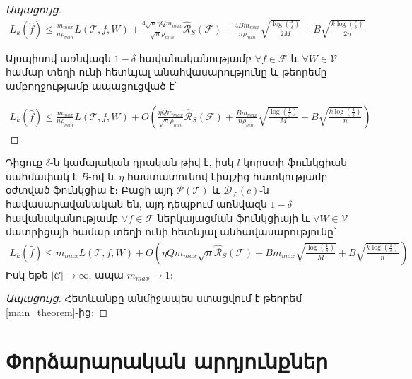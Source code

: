 \documentclass[12pt]{article}
\begin{document}
\begin{proof}[Ապացույց]
 
\begin{align*}
\label{ineq_rad_10}
L_k(\hat{f}) \leq  \frac{m_{max}}{n \rho_{min}}  L(\mathcal{T}, f, W) +
\frac{4 \sqrt{n}\eta Qm_{max}}{\sqrt{n}\rho_{min}} \hat{\mathcal{R}}_S(\mathcal{F})+    \frac{4Bm_{max}}{n\rho_{min}}\sqrt{\frac{\log \left( \frac{4}{\delta} \right)}{2M}} + B\sqrt{\frac{k\log \left(\frac{2}{\delta}\right) }{2n}}
\end{align*}

Այսպիսով առնվազն $1-\delta$ հավանականությամբ $\forall f \in \mathcal{F}$ և $\forall W \in \mathcal{V}$ համար տեղի ունի հետևյալ անահվասարությունը և թեորեմը ամբողջությամբ ապացուցված է՝

\begin{align*}
L_k(\hat{f}) \leq  \frac{m_{max}}{n \rho_{min}}  L(\mathcal{T}, f, W)+ O\left(
\frac{\eta Qm_{max}}{\sqrt{n}\rho_{min}} \hat{\mathcal{R}}_S(\mathcal{F})+    \frac{Bm_{max}}{n\rho_{min}}\sqrt{\frac{\log \left( \frac{1}{\delta} \right)}{M}} + B\sqrt{\frac{k\log \left(\frac{1}{\delta}\right) }{n}} \right)
\end{align*}
 \end{proof}
 
 
 \begin{corollary}
Դիցուք $\delta$-ն կամայական դրական թիվ է, իսկ $l$ կորստի ֆունկցիան սահմափակ է $B$-ով և $\eta$ հաստատունով Լիպշից հատկությամբ օժտված ֆունկցիա է։ Բացի այդ $\mathcal{P}(\mathcal{T})$ և $\mathcal{D}_\mathcal{T}(c)$-ն հավասարավանական են, այդ դեպքում առնվազն $1-\delta$ հավանականությամբ $\forall f \in \mathcal{F}$ ներկայացման ֆունկցիայի և $\forall W \in \mathcal{V}$ մատրիցայի համար տեղի ունի հետևյալ անհավասարությունը՝ 
\begin{align*}
L_k(\hat{f}) \leq m_{max}  L(\mathcal{T}, f, W)+ O\left(
\eta Qm_{max}\sqrt{n} \hat{\mathcal{R}}_S(\mathcal{F})+   Bm_{max}\sqrt{\frac{\log \left( \frac{1}{\delta} \right)}{M}} + B\sqrt{\frac{k\log \left(\frac{1}{\delta}\right) }{n}} \right)
\end{align*}
Իսկ եթե $|\mathcal{C}| \rightarrow \infty$, ապա $m_{max} \rightarrow 1$։
\end{corollary}
\begin{proof}[Ապացույց]
Հետևանքը անմիջապես ստացվում է թեորեմ \ref{main_theorem}-ից։
\end{proof} 


\pagebreak

\section*{\hfill Փորձարարական արդյունքներ \hfill} \noindent
{}
{}
\end{document}
